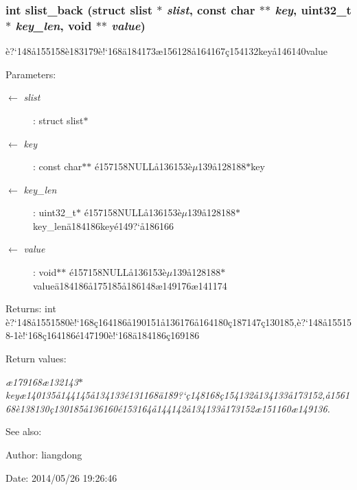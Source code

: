 \subsubsection{\setlength{\rightskip}{0pt plus 5cm}int slist\_\-back (struct slist $\ast$ {\em slist}, const char $\ast$$\ast$ {\em key}, uint32\_\-t $\ast$ {\em key\_\-len}, void $\ast$$\ast$ {\em value})}\label{slist_8c_a14}


\`{e}?`148\aa{}155158\`{e}183179\`{e}!`168\"{a}184173\ae{}156128\aa{}164167\c{c}154132key\aa{}146140value 

\begin{Desc}
\item[Parameters:]
\begin{description}
\item[\mbox{$\leftarrow$} {\em slist}]: struct slist$\ast$ \item[\mbox{$\leftarrow$} {\em key}]: const char$\ast$$\ast$ \'{e}157158NULL\aa{}136153\`{e}$\mu$139\aa{}128188$\ast$key \item[\mbox{$\leftarrow$} {\em key\_\-len}]: uint32\_\-t$\ast$ \'{e}157158NULL\aa{}136153\`{e}$\mu$139\aa{}128188$\ast$key\_\-len\"{a}184186key\'{e}149?`\aa{}186166 \item[\mbox{$\leftarrow$} {\em value}]: void$\ast$$\ast$ \'{e}157158NULL\aa{}136153\`{e}$\mu$139\aa{}128188$\ast$value\"{a}184186\aa{}175185\aa{}186148\ae{}149176\ae{}141174 \end{description}
\end{Desc}
\begin{Desc}
\item[Returns:]int \`{e}?`148\aa{}1551580\`{e}!`168\c{c}164186\aa{}190151\aa{}136176\aa{}164180\c{c}187147\c{c}130185,\`{e}?`148\aa{}155158-1\`{e}!`168\c{c}164186\'{e}147190\`{e}!`168\"{a}184186\c{c}169186 \end{Desc}
\begin{Desc}
\item[Return values:]
\begin{description}
\item[{\em \ae{}179168\ae{}132143$\ast$key\ae{}140135\aa{}144145\aa{}134133\'{e}131168\"{a}189?`\c{c}148168\c{c}154132\aa{}134133\aa{}173152,\aa{}156168\`{e}138130\c{c}130185\aa{}136160\'{e}153164\aa{}144142\aa{}134133\aa{}173152\ae{}151160\ae{}149136.}]\end{description}
\end{Desc}
\begin{Desc}
\item[See also:]\end{Desc}
\begin{Desc}
\item[Author:]liangdong \end{Desc}
\begin{Desc}
\item[Date:]2014/05/26 19:26:46 \end{Desc}

